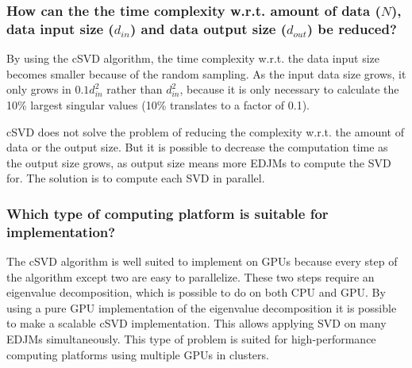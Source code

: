 \subsubsection*{How can the the time complexity w.r.t. amount of data ($N$), data input size ($d_{in}$) and data output size ($d_{out}$) be reduced?}

By using the cSVD algorithm, the time complexity w.r.t. the data input size becomes smaller because of the random sampling. As the input data size grows, it only grows in $0.1d_{in}^2$ rather than $d_{in}^2$, because it is only necessary to calculate the 10\% largest singular values (10\% translates to a factor of 0.1).

cSVD does not solve the problem of reducing the complexity w.r.t. the amount of data or the output size. But it is possible to decrease the computation time as the output size grows, as output size means more EDJMs to compute the SVD for. The solution is to compute each SVD in parallel.

\subsubsection*{Which type of computing platform is suitable for implementation?}

The cSVD algorithm is well suited to implement on GPUs because every step of the algorithm except two are easy to parallelize. These two steps require an eigenvalue decomposition, which is possible to do on both CPU and GPU. By using a pure GPU implementation of the eigenvalue decomposition it is possible to make a scalable cSVD implementation. This allows applying SVD on many EDJMs simultaneously. This type of problem is suited for high-performance computing platforms using multiple GPUs in clusters.